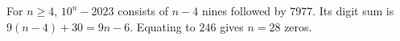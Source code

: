 For $n\ge4$, $10^n-2023$ consists of $n-4$ nines followed by $7977$. Its digit sum is $9(n-4)+30=9n-6$. Equating to $246$ gives $n=\boxed{28}$ zeros.
